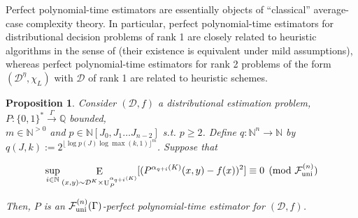 \documentclass{article}
\numberwithin{equation}{section}
\theoremstyle{definition}
\theoremstyle{plain}
\newtheorem{proposition}{Proposition}[section]
\newcommand{\Bool}{\{0,1\}}
\newcommand{\Words}{{\Bool^*}}
\DeclareMathOperator{\E}{E}
\DeclareMathOperator{\Un}{U}
\newcommand{\Nats}{\mathbb{N}}
\newcommand{\Rats}{\mathbb{Q}}
\newcommand{\NatPolyJ}{\Nats[J_0, J_1 \ldots J_{n-2}]}
\newcommand{\NatFun}{\Nats^n \rightarrow}
\newcommand{\Floor}[1]{\lfloor #1 \rfloor}
\newcommand{\Dist}{\mathcal{D}}
\newcommand{\Fall}{\mathcal{F}}
\newcommand{\FallU}{{\Fall_{\textnormal{uni}}^{(n)}}}
\newcommand{\Scheme}{\xrightarrow{\Gamma}}
\begin{document}
Perfect polynomial-time estimators are essentially objects of \enquote{classical} average-case complexity theory. In particular, perfect polynomial-time estimators for distributional decision problems of rank 1 are closely related to heuristic algorithms in the sense of \cite{Bogdanov_2006} (their existence is equivalent under mild assumptions), whereas perfect polynomial-time estimators for rank 2 problems of the form ${(\Dist^\eta,\chi_L)}$ with ${\Dist}$ of rank 1 are related to heuristic schemes.

\begin{samepage}
\begin{proposition}
\label{prp:fall_uni_qpoly}
Consider ${(\Dist,f)}$ a distributional estimation problem, ${P: \Words \Scheme \Rats}$ bounded,\\ $m \in \Nats^{>0}$ and ${p \in \NatPolyJ}$ s.t. ${p \geq 2}$. Define ${q: \NatFun \Nats}$ by ${q(J,k):=2^{\Floor{\log p(J)\log \max(k,1)}^m}}$. Suppose that 

\begin{equation}
\label{eqn:prp__fall_uni_qpoly}
\sup_{i \in \Nats} \E_{(x,y) \sim \Dist^K \times \Un_P^{\alpha_{q+i}(K)}}[(P^{\alpha_{q+i}(K)}(x,y)-f(x))^2] \equiv 0 \pmod \FallU
\end{equation}

Then, ${P}$ is an ${\FallU(\Gamma)}$-perfect polynomial-time estimator for ${(\Dist,f)}$.

\end{proposition}
\end{samepage}
\end{document}
